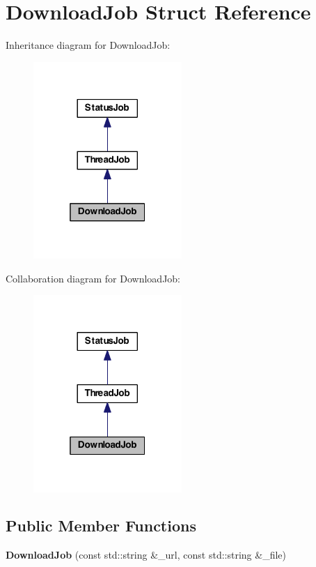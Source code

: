 \hypertarget{struct_download_job}{\section{Download\-Job Struct Reference}
\label{struct_download_job}
}


Inheritance diagram for Download\-Job\-:
\nopagebreak
\begin{figure}[H]
\begin{center}
\leavevmode
\includegraphics[width=160pt]{struct_download_job__inherit__graph}
\end{center}
\end{figure}


Collaboration diagram for Download\-Job\-:
\nopagebreak
\begin{figure}[H]
\begin{center}
\leavevmode
\includegraphics[width=160pt]{struct_download_job__coll__graph}
\end{center}
\end{figure}
\subsection*{Public Member Functions}
\begin{DoxyCompactItemize}
\item 
\hypertarget{struct_download_job_aa7f2822b6fb2214f42118a09f8106cbf}{{\bfseries Download\-Job} (const std\-::string \&\-\_\-url, const std\-::string \&\-\_\-file)}\label{struct_download_job_aa7f2822b6fb2214f42118a09f8106cbf}

\end{DoxyCompactItemize}

